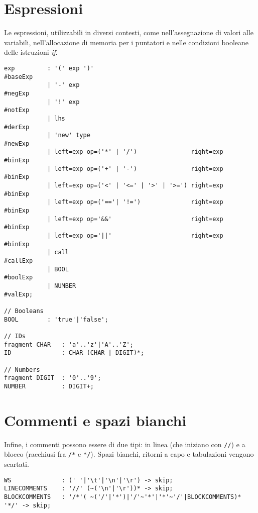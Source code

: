 \documentclass[../report.tex]{subfiles}
\begin{document}
\section{Espressioni}\label{s:espressioni}
Le espressioni, utilizzabili in diversi contesti, come nell'assegnazione di valori alle variabili, nell'allocazione di memoria per i puntatori e nelle condizioni booleane delle istruzioni \textit{if}.
\begin{lstlisting}[style=antlr]
exp         : '(' exp ')'                                       #baseExp
            | '-' exp                                           #negExp
            | '!' exp                                           #notExp
            | lhs                                               #derExp
            | 'new' type                                        #newExp
            | left=exp op=('*' | '/')               right=exp   #binExp
            | left=exp op=('+' | '-')               right=exp   #binExp
            | left=exp op=('<' | '<=' | '>' | '>=') right=exp   #binExp
            | left=exp op=('=='| '!=')              right=exp   #binExp
            | left=exp op='&&'                      right=exp   #binExp
            | left=exp op='||'                      right=exp   #binExp
            | call                                              #callExp
            | BOOL                                              #boolExp
            | NUMBER                                            #valExp;

// Booleans
BOOL        : 'true'|'false';

// IDs
fragment CHAR   : 'a'..'z'|'A'..'Z';
ID              : CHAR (CHAR | DIGIT)*;

// Numbers
fragment DIGIT  : '0'..'9';
NUMBER          : DIGIT+;
\end{lstlisting}

\section{Commenti e spazi bianchi}\label{s:commenti-spazi-bianchi}
Infine, i commenti possono essere di due tipi: in linea (che iniziano con \verb|//|) e a blocco (racchiusi fra \verb|/*| e \verb|*/|). Spazi bianchi, ritorni a capo e tabulazioni vengono scartati.
\begin{lstlisting}[style=antlr]
WS              : (' '|'\t'|'\n'|'\r') -> skip;
LINECOMMENTS    : '//' (~('\n'|'\r'))* -> skip;
BLOCKCOMMENTS   : '/*'( ~('/'|'*')|'/'~'*'|'*'~'/'|BLOCKCOMMENTS)* '*/' -> skip;
\end{lstlisting}
\end{document}

